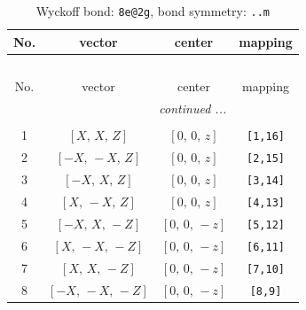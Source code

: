 \documentclass[fleqn,8pt]{jsarticle}
\begin{document}
\begin{longtable}{cccc}
\caption{Wyckoff bond: {\tt 8e@2g}, bond symmetry: {\tt ..m}}
 \\
 \hline \hline
No. & vector & center & mapping \\ \hline \endfirsthead

\multicolumn{3}{l}{\tablename\ \thetable{}} \\
 \hline \hline
No. & vector & center & mapping \\ \hline \endhead

 \hline \hline
\multicolumn{3}{r}{\footnotesize\it continued ...} \\ \endfoot

 \hline \hline
\multicolumn{3}{r}{} \\ \endlastfoot

1 & $\left[ X,\, X,\, Z \right]$ & $\left[ 0,\, 0,\, z \right]$ & {\tt [1,16]} \\ \hline
2 & $\left[ - X,\, - X,\, Z \right]$ & $\left[ 0,\, 0,\, z \right]$ & {\tt [2,15]} \\ \hline
3 & $\left[ - X,\, X,\, Z \right]$ & $\left[ 0,\, 0,\, z \right]$ & {\tt [3,14]} \\ \hline
4 & $\left[ X,\, - X,\, Z \right]$ & $\left[ 0,\, 0,\, z \right]$ & {\tt [4,13]} \\ \hline
5 & $\left[ - X,\, X,\, - Z \right]$ & $\left[ 0,\, 0,\, - z \right]$ & {\tt [5,12]} \\ \hline
6 & $\left[ X,\, - X,\, - Z \right]$ & $\left[ 0,\, 0,\, - z \right]$ & {\tt [6,11]} \\ \hline
7 & $\left[ X,\, X,\, - Z \right]$ & $\left[ 0,\, 0,\, - z \right]$ & {\tt [7,10]} \\ \hline
8 & $\left[ - X,\, - X,\, - Z \right]$ & $\left[ 0,\, 0,\, - z \right]$ & {\tt [8,9]} \\
\end{longtable}
\renewcommand{\arraystretch}{1.2}
\end{document}
